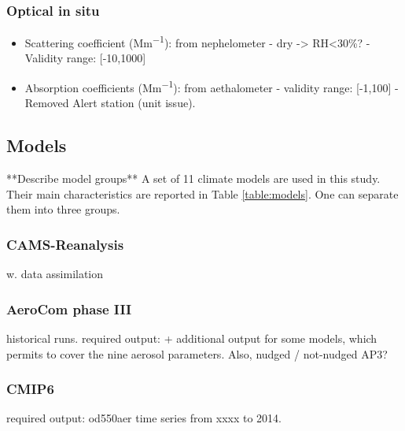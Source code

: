 \documentclass[journal abbreviation, manuscript]{copernicus}
\begin{document}
\subsubsection{Optical in situ}
\begin{itemize}
 \item Scattering coefficient (\unit{Mm^{-1}}): from nephelometer - dry -> RH<30\%? - Validity range: [-10,1000]
 \item Absorption coefficients (\unit{Mm^{-1}}): from aethalometer - validity range: [-1,100] - Removed Alert station (unit issue).
\end{itemize}

\subsection{Models}
**Describe model groups**
A set of 11 climate models are used in this study. Their main characteristics are reported in Table \ref{table:models}.  One can separate them into three groups.

\subsubsection{CAMS-Reanalysis}
w. data assimilation

\subsubsection{AeroCom phase III}
historical runs.
required output: + additional output for some models, which permits to cover the nine aerosol parameters.
Also, nudged / not-nudged AP3?

\subsubsection{CMIP6}
required output: od550aer time series from xxxx to 2014.
\end{document}
